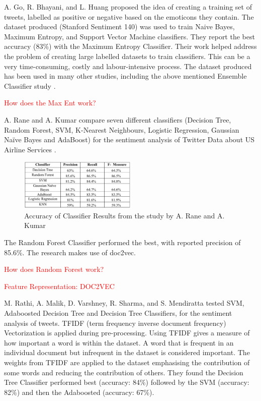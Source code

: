 A. Go, R. Bhayani, and L. Huang \cite{Go2009} proposed the  idea of creating a training set of tweets, labelled as positive or negative based on the emoticons they contain. The dataset produced (Stanford Sentiment 140) was used to train Naive Bayes, Maximum Entropy, and Support Vector Machine classifiers. They report the best accuracy (83\%) with the Maximum Entropy Classifier. Their work helped address the problem of creating large labelled datasets to train classifiers. This can be a very time-consuming, costly and labour-intensive process. The dataset produced has been used in many other studies, including the above mentioned Ensemble Classifier study \cite{Ankit2018}.

\textcolor{red}{How does the Max Ent work?}

A. Rane and A. Kumar compare seven different classifiers (Decision Tree, Random Forest, SVM, K-Nearest Neighbours, Logistic Regression, Gaussian Naïve Bayes and AdaBoost) for the sentiment analysis of Twitter Data about US Airline Services \cite{Rane2018}. 
\begin{figure}
    \centering
    \includegraphics[width=0.5\textwidth]{literature_review/arane_classifier_results.PNG}
    \caption{Accuracy of Classifier Results from the study by A. Rane and A. Kumar \cite{Rane2018}}
\end{figure}
The Random Forest Classifier performed the best, with reported precision of 85.6\%. The research makes use of doc2vec.

\textcolor{red}{How does Random Forest work?}

\textcolor{red}{Feature Representation: DOC2VEC}

M. Rathi, A. Malik, D. Varshney, R. Sharma, and S. Mendiratta \cite{Raithi2018} tested SVM, Adaboosted Decision Tree and Decision Tree Classifiers, for the sentiment analysis of tweets. TFIDF (term frequency inverse document frequency) Vectorization is applied during pre-processing. Using TFIDF gives a measure of how important a word is within the dataset. A word that is frequent in an individual document but infrequent in the dataset is considered important. The weights from TFIDF are applied to the dataset emphasising the contribution of some words and reducing the contribution of others. They found the Decision Tree Classifier performed best  (accuracy: 84\%) followed by the SVM (accuracy: 82\%) and then the Adaboosted (accuracy: 67\%). 

